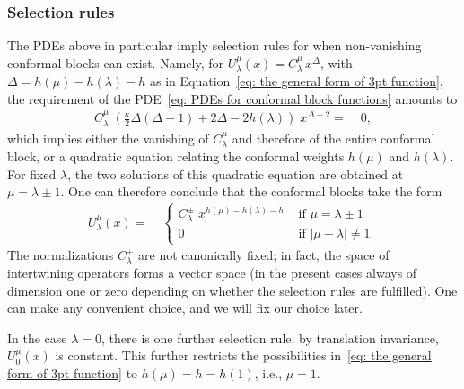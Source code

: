 \documentclass[oneside,english]{amsart}
\numberwithin{equation}{section}
\numberwithin{figure}{section}
\theoremstyle{plain}
\theoremstyle{plain}
\theoremstyle{plain}
\theoremstyle{remark}
\theoremstyle{plain}
\theoremstyle{plain}
\theoremstyle{plain}
\theoremstyle{plain}
\theoremstyle{plain}
\theoremstyle{plain}
\theoremstyle{plain}
\theoremstyle{plain}
\newcommand{\blue}[1]{{\color{blue} #1}}
\begin{document}
\subsubsection{\textbf{Selection rules}}

The PDEs above in particular imply selection rules for when non-vanishing conformal
blocks can exist. Namely, for $U_{\lambda}^{\mu}(x)=C_{\lambda}^{\mu}\,x^{\Delta}$,
with $\Delta=h(\mu)-h(\lambda)-h$ as in Equation~\eqref{eq: the general form of 3pt function},
the requirement of the PDE~\eqref{eq: PDEs for conformal block functions} amounts to
\begin{align*}
C_{\lambda}^{\mu}\;\left(\frac{\kappa}{2}\Delta(\Delta-1)+2\Delta -2h(\lambda)\right)\;x^{\Delta-2}=\; & 0,
\end{align*}
which implies either the vanishing of $C_{\lambda}^{\mu}$ and therefore
of the entire conformal block, or a quadratic equation relating the
conformal weights $h(\mu)$ and $h(\lambda)$. For fixed $\lambda$,
the two solutions of this quadratic equation are obtained at $\mu=\lambda\pm1$.
One can therefore conclude that the conformal blocks take the form
\begin{align}
U_{\lambda}^{\mu}(x)=\; & \begin{cases}
C_{\lambda}^{\pm}\;x^{h(\mu)-h(\lambda)-h} & \text{ if }\mu=\lambda\pm1\\
0 & \text{ if }|\mu-\lambda|\neq1.
\end{cases}\label{eq: form of 3pt function with selection}
\end{align}
The normalizations $C_{\lambda}^{\pm}$ are not canonically fixed;
in fact, the space of intertwining operators forms a vector space
(in the present cases always of dimension %
one or zero depending on whether %
the selection rules are fulfilled). 
One can make any convenient choice, and we will fix our choice later.

In the case $\lambda=0$, there is one further selection rule:
by translation invariance, %
$U_{0}^{\mu}(x)$ is constant. This further restricts the possibilities
in~\eqref{eq: the general form of 3pt function} to $h(\mu)=h=h(1)$, i.e., $\mu=1$.
\end{document}
